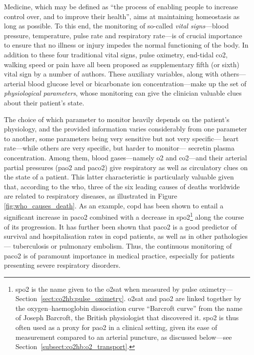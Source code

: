 Medicine, which may be defined as \enquote{the process of enabling people to increase control over, and to improve their health}\cite{who_health_glossary_2021}, aims at maintaining homeostasis as long as possible. To this end, the monitoring of so-called \emph{vital signs}---blood pressure, temperature, pulse rate and respiratory rate\cite{lockwood2004}---is of crucial importance to ensure that no illness or injury impedes the normal functioning of the body. In addition to these four traditional vital signs, pulse oximetry\cite{callahan2008}, end-tidal \gls{co2}\cite{ahrens2004, hunter2014}, walking speed\cite{middleton2015} or pain\cite{morone2013} have all been proposed as supplementary fifth (or sixth) vital sign by a number of authors. These auxiliary variables, along with others---\eg{} arterial blood glucose level or bicarbonate ion concentration---make up the set of \emph{physiological parameters}, whose monitoring can give the clinician valuable clues about their patient's state.


The choice of which parameter to monitor heavily depends on the patient's physiology, and the provided information varies considerably from one parameter to another, some parameters being very sensitive but not very specific---\eg{} heart rate---while others are very specific, but harder to monitor---\eg{} secretin plasma concentration. Among them, blood gases---namely \gls{o2} and \gls{co2}---and their arterial partial pressures (\gls{pao2} and \gls{paco2}) give respiratory as well as circulatory clues on the state of a patient\cite{wagner2015}. This latter characteristic is particularly valuable given that, according to the \gls{who}, three of the six leading causes of deaths worldwide are related to respiratory diseases, as illustrated in Figure \ref{fig:who_causes_death}. As an example, \gls{copd} has been shown to entail a significant increase in \gls{paco2} combined with a decrease in \gls{spo2}\footnote{\gls{spo2} is the name given to the \gls{o2sat} when measured by pulse oximetry---Section~\ref{sect:co2hb:pulse_oximetry}. \gls{o2sat} and \gls{pao2} are linked together by the oxygen–haemoglobin dissociation curve \aka{} \enquote{Barcroft curve} from the name of Joseph Barcroft, the British physiologist that discovered it\cite{barcroft1909}. \gls{spo2} is thus often used as a proxy for \gls{pao2} in a clinical setting, given its ease of measurement compared to an arterial puncture\cite{nitzan2014, jubran2015, tamura2019}, as discussed below---see Section~\ref{subsect:co2hb:o2_transport}.} along the course of its progression\cite{cukic2014, rajeh2016}. It has further been shown that \gls{paco2} is a good predictor of survival and hospitalisation rates in \gls{copd} patients\cite{nava1994, kessler1999, park2006}, as well as in other pathologies---\eg{} tuberculosis\cite{tsuboi2010} or pulmonary embolism\cite{ozsu2012}. Thus, the continuous monitoring of \gls{paco2} is of paramount importance in medical practice, especially for patients presenting severe respiratory disorders.

